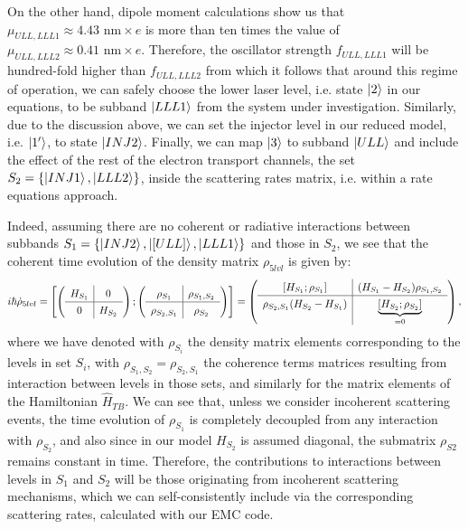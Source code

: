 \documentclass[10pt,letterpaper]{article}
\begin{document}
{On the other hand, dipole moment calculations show us that $\mu_{ULL,LLL1} \approx 4.43 \text{ nm} \times e $ is more than ten times the value of $\mu_{ULL,LLL2} \approx 0.41 \text{ nm} \times e$. Therefore, the oscillator strength $f_{ULL,LLL1}$ will be hundred-fold higher than $f_{ULL,LLL2}$ from which it follows that around this regime of operation, we can safely choose the lower laser level, i.e. state $\Ket{2}$ in our equations, to be subband $\Ket{LLL1}$ from the system under investigation. Similarly, due to the discussion above, we can set the injector level in our reduced model, i.e. $\Ket{1'}$, to state $\Ket{INJ2}$. Finally, we can map $\Ket{3}$ to subband $\Ket{ULL}$ and include the effect of the rest of the electron transport channels, the set $ S_2 =  \{\Ket{INJ1},\Ket{LLL2}\}$, inside the scattering rates matrix, i.e. within a rate equations approach.

 Indeed, assuming there are no coherent or radiative interactions between subbands  $S_1  = \{\Ket{INJ2}, \Ket{[ULL]}, \Ket{LLL1}\}$ and those in $S_2$, we see that the coherent time evolution of the density matrix $\rho_{5lvl}$ is given by:
\begin{align}
i\hbar \dot{\rho}_{5lvl} =
\renewcommand\arraystretch{1.3} \left[ \left ( \begin{array}{c | c}
H_{S_1} & 0 \\ 
\hline 
0 & H_{S_2}
\end{array} \right) ; \left ( \begin{array}{c | c}
\rho_{S_1} & \rho_{S_1,S_2} \\ 
\hline 
\rho_{S_2, S_1} & \rho_{S_2}
\end{array} \right)
\right] = 
\left ( \begin{array}{c | c}
[H_{S_1};\rho_{S_1}] &(H_{S_1}-H_{S_2}) \rho_{S_1,S_2}  \\ 
\hline 
\rho_{S_2, S_1}(H_{S_2}-H_{S_1}) & \underbrace{[H_{S_2};\rho_{S_2}]}_{=0}
\end{array} \right) ,
\end{align}
where we have denoted with $\rho_{S_i}$ the density matrix elements corresponding to the levels in set $S_i$, with $\rho_{S_1,S_2} = \rho_{S_2,S_1}$ the coherence terms matrices resulting from interaction between levels in those sets, and similarly for the matrix elements of the Hamiltonian $\hat{H}_{TB}$. We can see that, unless we consider incoherent scattering events, the time evolution of $\rho_{S_1}$ is completely decoupled from any interaction with $\rho_{S_2}$, and also since in our model $H_{S_2}$ is assumed diagonal, the submatrix $\rho_{S2}$ remains constant in time. Therefore, the contributions to interactions between levels in $S_1$ and $S_2$ will be those originating from incoherent scattering mechanisms, which we can self-consistently include via the corresponding scattering rates, calculated with our EMC code.

}
\end{document}
